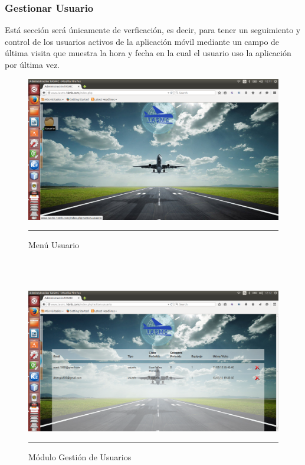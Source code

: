 \subsubsection{Gestionar Usuario}
Está sección será únicamente de verficación, es decir, para tener un seguimiento y control de los usuarios activos de la aplicación móvil 
mediante un campo de última visita que muestra la hora y fecha en la cual el usuario uso la aplicación por última vez.
\begin{figure}[h!]
	\centering
		\includegraphics[width=1\textwidth]{Figuras/indexUsuario.png}
		\rule{35em}{0.5pt}
	\caption[Menú Usuario]{Menú Usuario}
	\label{fig:menuUsuario}
\end{figure}
\\
\\
\begin{figure}[h!]
	\centering
		\includegraphics[width=1\textwidth]{Figuras/usuarios.png}
		\rule{35em}{0.5pt}
	\caption[Módulo Gestión de Usuarios]{Módulo Gestión de Usuarios}
	\label{fig:moduloUsuarios}
\end{figure}
\clearpage

